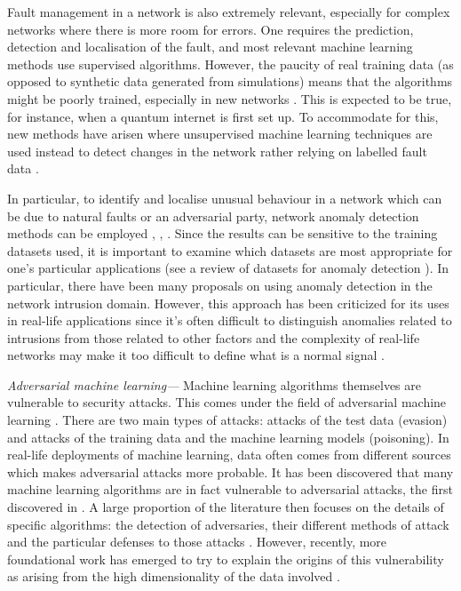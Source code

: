\documentclass[twocolumn, aps, rmp, amsmath, amssymb, nofootinbib, superscriptaddress, longbibliography, floatfix, table-of-contents, eqsecnum]{revtex4-2}
\begin{document}
Fault management in a network is also extremely relevant, especially for complex networks where there is more room for errors. One requires the prediction, detection and localisation of the fault, and most relevant machine learning methods use supervised algorithms. However, the paucity of real training data (as opposed to synthetic data generated from simulations) means that the algorithms might be poorly trained, especially in new networks \cite{hood1997proactive, kogeda2006prediction, snow2005assessing}. This is expected to be true, for instance, when a quantum internet is first set up. To accommodate for this, new methods have arisen where unsupervised machine learning techniques are used instead to detect changes in the network rather relying on labelled fault data \cite{hajji2005statistical}.

In particular, to identify and localise unusual behaviour in a network which can be due to natural faults or an adversarial party, network anomaly detection methods can be employed \cite{ahmed2007machine}, \cite{fraley2017promise}, \cite{joseph2013machine}. Since the results can be sensitive to the training datasets used, it is important to examine which datasets are most appropriate for one's particular applications (see a review of datasets for anomaly detection \cite{yavanoglu2017review}). In particular, there have been many proposals on using anomaly detection in the network intrusion domain. However, this approach has been criticized for its uses in real-life applications since it's often difficult to distinguish anomalies
related to intrusions from those related to other factors and the complexity of real-life networks may make it too difficult to define what is a normal signal \cite{sommer2010outside}.

\textit{Adversarial machine learning---} Machine learning algorithms themselves are vulnerable to security attacks. This comes under the field of adversarial machine learning \cite{huang2011adversarial}. There are two main types of attacks: attacks of the test data (evasion) and attacks of the training data and the machine learning models (poisoning). In real-life deployments of machine learning, data often comes from different sources which makes adversarial attacks more probable. It has been discovered that many machine learning algorithms are in fact vulnerable to adversarial attacks, the first discovered in \cite{szegedy2013intriguing}. A large proportion of the literature then focuses on the details of specific algorithms: the detection of adversaries, their different methods of attack and the particular defenses to those attacks \cite{kurakin2018adversarial}. However, recently, more foundational work has emerged to try to explain the origins of this vulnerability as arising from the high dimensionality of the data involved \cite{goodfellow2014explaining, gilmer2018adversarial,mahloujifar2018curse}.
\end{document}
